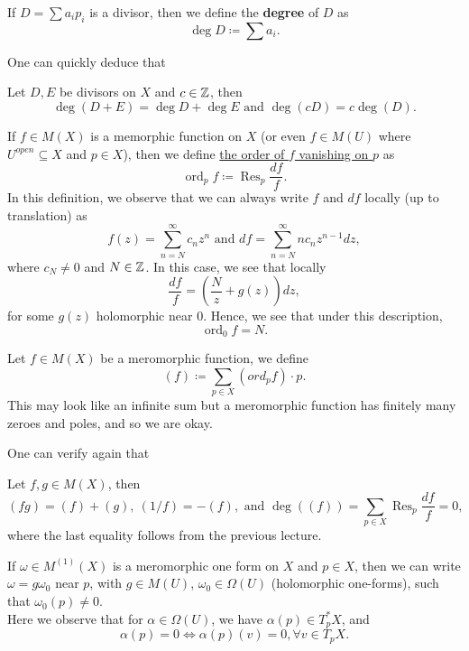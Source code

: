 \documentclass{article}
\begin{document}
{\begin{definition}
    If $D = \sum a_i p_i$ is a divisor, then we define the \textbf{degree} of $D$ as
    \[\operatorname{deg} D \coloneqq \sum a_i.\]
\end{definition}

One can quickly deduce that
\begin{lemma}
    Let $D, E$ be divisors on $X$ and $c \in \mathbb{Z}$, then
    \[\deg(D+E) = \deg D + \deg E \text{ and } \deg(cD) = c \deg(D).\]
\end{lemma}

\begin{definition}
If $f \in M(X)$ is a memorphic function on $X$ (or even $f \in M(U)$ where $U^{open} \subseteq X$ and $p \in X$), then we define \underline{the order of $f$ vanishing on $p$} as  
\[\operatorname{ord}_p f \coloneqq \operatorname{Res}_p \frac{df}{f}.\]
In this definition, we observe that we can always write $f$ and $df$ locally (up to translation) as
\[f(z) = \sum_{n = N}^\infty c_n z^n \text{ and } df = \sum_{n = N}^\infty n c_n z^{n-1} dz,\]
where $c_N \neq 0$ and $N \in \mathbb{Z}$. In this case, we see that locally
\[\frac{df}{f} = (\frac{N}{z} + g(z) ) dz,\]
for some $g(z)$ holomorphic near $0$. Hence, we see that under this description,
\[\operatorname{ord}_0 f = N.\]
\end{definition}


\begin{definition}
    Let $f \in M(X)$ be a meromorphic function, we define
    \[(f) \coloneqq \sum_{p \in X} (ord_p f) \cdot p.\]
    This may look like an infinite sum but a meromorphic function has finitely many zeroes and poles, and so we are okay.
\end{definition}

One can verify again that
\begin{lemma}
    Let $f, g \in M(X)$, then
    \[(fg) = (f) + (g),\ (1/f) = -(f), \text{ and } \deg((f)) = \sum_{p \in X} \operatorname{Res}_p \frac{df}{f} = 0,\]
    where the last equality follows from the previous lecture.
\end{lemma}

If $\omega \in M^{(1)}(X)$ is a meromorphic one form on $X$ and $p \in X$, then we can write $\omega = g \omega_0$ near $p$, with $g \in M(U)$, $\omega_0 \in \Omega(U)$ (holomorphic one-forms), such that $\omega_0(p) \neq 0$.\\

Here we observe that for $\alpha \in \Omega(U)$, we have $\alpha(p) \in T^*_p X$, and 
\[\alpha(p) = 0 \iff  \alpha(p)(v) = 0, \forall v \in T_p X.\]

}
\end{document}
